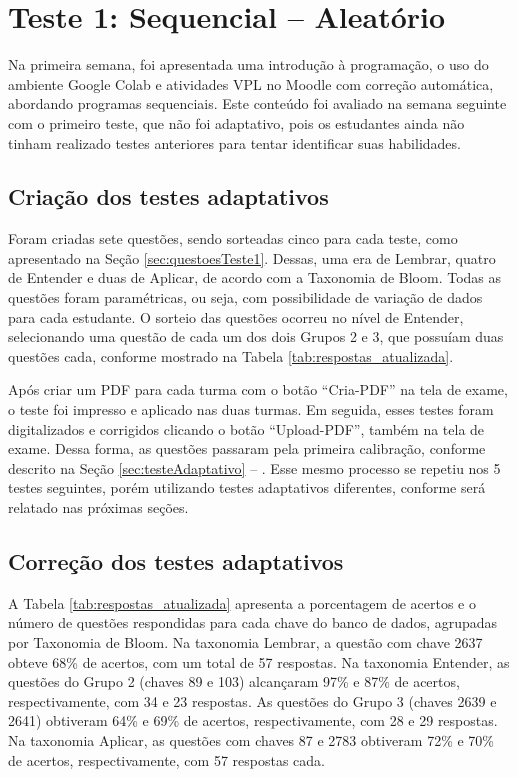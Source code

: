 \section{Teste 1: Sequencial -- Aleatório}

Na primeira semana, foi apresentada uma introdução à programação, o uso do ambiente Google Colab e atividades VPL no Moodle com correção automática, abordando programas sequenciais. Este conteúdo foi avaliado na semana seguinte com o primeiro teste, que não foi adaptativo, pois os estudantes ainda não tinham realizado testes anteriores para tentar identificar suas habilidades. 

\subsection{Criação dos testes adaptativos}

Foram criadas sete questões, sendo sorteadas cinco para cada teste, como apresentado na Seção \ref{sec:questoesTeste1}. Dessas, uma era de Lembrar, quatro de Entender e duas de Aplicar, de acordo com a Taxonomia de Bloom. Todas as questões foram paramétricas, ou seja, com possibilidade de variação de dados para cada estudante. O sorteio das questões ocorreu no nível de Entender, selecionando uma questão de cada um dos dois Grupos 2 e 3, que possuíam duas questões cada, conforme mostrado na Tabela \ref{tab:respostas_atualizada}.

Após criar um PDF para cada turma com o botão ``Cria-PDF'' na tela de exame, o teste foi impresso e aplicado nas duas turmas. Em seguida, esses testes foram digitalizados e corrigidos clicando o botão ``Upload-PDF'', também na tela de exame. Dessa forma, as questões passaram pela primeira calibração, conforme descrito na Seção \ref{sec:testeAdaptativo} -- . Esse mesmo processo se repetiu nos 5 testes seguintes, porém utilizando testes adaptativos diferentes, conforme será relatado nas próximas seções.

\subsection{Correção dos testes adaptativos}

A Tabela \ref{tab:respostas_atualizada} apresenta a porcentagem de acertos e o número de questões respondidas para cada chave do banco de dados, agrupadas por Taxonomia de Bloom. Na taxonomia Lembrar, a questão com chave 2637 obteve 68\% de acertos, com um total de 57 respostas. Na taxonomia Entender, as questões do Grupo 2 (chaves 89 e 103) alcançaram 97\% e 87\% de acertos, respectivamente, com 34 e 23 respostas. As questões do Grupo 3 (chaves 2639 e 2641) obtiveram 64\% e 69\% de acertos, respectivamente, com 28 e 29 respostas. Na taxonomia Aplicar, as questões com chaves 87 e 2783 obtiveram 72\% e 70\% de acertos, respectivamente, com 57 respostas cada.


